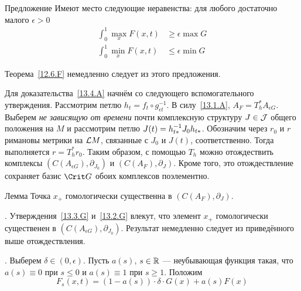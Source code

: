 \begin{thm}{Предложение}\label{13.4.A}
Имеют место следующие неравенства: для любого достаточно малого $\epsilon>0$
\begin{align*}
\int_{0}^{1}\max_{x}F(x,t) &\ge \epsilon\max G\\
\int_{0}^{1}\min_{x}F(x,t) &\le \epsilon\min G
\end{align*}
\end{thm}

Теорема~\ref{12.6.F} немедленно следует из этого предложения.

Для доказательства~\ref{13.4.A} начнём со следующего вспомогательного утверждения.
Рассмотрим петлю $h_{t} = f_{t} \circ g_{\epsilon t}^{-1}$.
В силу~\ref{13.1.A}, $A_{F} = T_{h}^{*}A_{\epsilon G}$.
Выберем \emph{не зависящую от времени} почти комплексную структуру
$J\in\mathcal{J}$ общего положения на $M$ и рассмотрим петлю $J(t) \z= h_{t*}^{-1}
J_{0}h_{t*}$. 
Обозначим через $r_{0}$ и $r$ римановы метрики на $\mathcal{L} M$, связанные с $J_{0}$ и $J(t)$, соответственно. 
Тогда выполняется $r = T_{h}^{*}r_{0}$.
Таким образом, с помощью $T_{h}$ можно отождествить комплексы
$(C(A_{\epsilon G}), \partial_{J_{0}})$ и $(C(A_{F}), \partial_{J})$.
Кроме того, это отождествление сохраняет базис $\Crit G$ обоих
комплексов поэлементно.

\begin{thm}{Лемма}\label{13.4.B}
  Точка $x_{+}$ гомологически существенна в $(C(A_{F}), \partial_{J})$.  
\end{thm}

.
Утверждения~\ref{13.3.G} и~\ref{13.2.G} влекут, что
элемент $x_{+}$ гомологически существенен в $(C(A_{\epsilon G}), \partial_{J_{0}})$. 
Результат немедленно следует из приведённого выше отождествления.
\qeds

.
Выберем $\delta\in(0,\epsilon)$.
Пусть $a(s)$, $s\in\mathbb{R}$ — неубывающая функция такая, что
$a(s)\equiv0$ при $s\le0$ и $a(s)\equiv1$ при $s\ge1$.
Положим
\[
F_{s}(x, t) = (1 - a(s))\cdot\delta\cdot G(x) + a(s)F(x)
\]

